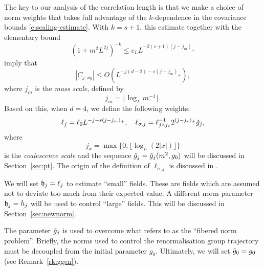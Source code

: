 The key to our analysis of the correlation length is that we make a choice of norm
weights that takes full advantage of the
$k$-dependence in the covariance bounds \eqref{e:scaling-estimate}.
With $k = s + 1$, this estimate together with the elementary bound
\begin{equation}
\label{e:mass-decay}
(1 + m^2 L^{2j})^{-k} \le c_L L^{-2(s+1)(j - j_m)_+}
\end{equation}
imply that
\begin{equation}
|C_{j;xy}| \le O(L^{-j (d - 2) - s (j - j_m)_+}),
\end{equation}
where $j_m$ is the \emph{mass scale}, defined by
\begin{equation}
\label{e:jmdef}
j_m	= \lfloor\log_{L} m^{-1}\rfloor.
\end{equation}
Based on this, when $d = 4$, we define the following weights:
\begin{equation}
\label{e:elldef-zz}
\ell_j
	=
\ell_0 L^{-j - s (j - j_m)_+},
	\quad
\ell_{\sigma,j}
	=
\ell_{j \wedge j_{x}}^{-1} 2^{(j - j_{x})_+} \tilde{g}_j,
\end{equation}
where
\begin{equation}
\label{e:jxdef}
j_x = \max\{0,\lfloor \log_{L} (2 |x|)\rfloor\}
\end{equation}
is the \emph{coalescence scale} and the sequence $\tilde{g}_j = \tilde{g}_j(m^2,g_0)$ will
be discussed in Section~\ref{sec:pt}.
The origin of the definition of $\ell_{\sigma,j}$ is discussed in
\cite[Remark~\ref{IE-rk:hsigmot}]{BS-rg-IE}.

We will set $\mathfrak{h}_j = \ell_j$ to estimate ``small'' fields. These are fields which
are assumed not to deviate too much from their expected value. A different norm
parameter $\mathfrak{h}_j = h_j$ will be used to control ``large'' fields.
This will be discussed in Section~\ref{sec:newnorm}.

\begin{rk}
The parameter $\tilde{g}_j$ is used to overcome what \cite{Abde07} refers to as the
``fibered norm problem''. Briefly, the norms used to control the renormalisation
group trajectory must be decoupled from the initial parameter $g_0$. Ultimately,
we will set $\tilde{g}_0 = g_0$ (see Remark~\ref{rk:ggen}).
\end{rk}


